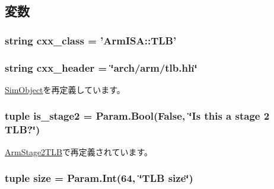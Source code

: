 \subsection{変数}
\hypertarget{classArmTLB_1_1ArmTLB_a58cd55cd4023648e138237cfc0822ae3}{
\subsubsection[{cxx\_\-class}]{\setlength{\rightskip}{0pt plus 5cm}string {\bf cxx\_\-class} = '{\bf ArmISA::TLB}'}}
\label{classArmTLB_1_1ArmTLB_a58cd55cd4023648e138237cfc0822ae3}
\hypertarget{classArmTLB_1_1ArmTLB_a17da7064bc5c518791f0c891eff05fda}{
\subsubsection[{cxx\_\-header}]{\setlength{\rightskip}{0pt plus 5cm}string {\bf cxx\_\-header} = \char`\"{}arch/arm/tlb.hh\char`\"{}}}
\label{classArmTLB_1_1ArmTLB_a17da7064bc5c518791f0c891eff05fda}


\hyperlink{classm5_1_1SimObject_1_1SimObject_a17da7064bc5c518791f0c891eff05fda}{SimObject}を再定義しています。\hypertarget{classArmTLB_1_1ArmTLB_a79c1ca5c107632a64c9583c96fbcc282}{
\subsubsection[{is\_\-stage2}]{\setlength{\rightskip}{0pt plus 5cm}tuple {\bf is\_\-stage2} = Param.Bool(False, \char`\"{}Is this a stage 2 TLB?\char`\"{})}}
\label{classArmTLB_1_1ArmTLB_a79c1ca5c107632a64c9583c96fbcc282}


\hyperlink{classArmTLB_1_1ArmStage2TLB_ae8e57fdf256a1e5df80b0c5ab8a52336}{ArmStage2TLB}で再定義されています。\hypertarget{classArmTLB_1_1ArmTLB_a377e5da8df1f89c5468c8b8cd07eac89}{
\subsubsection[{size}]{\setlength{\rightskip}{0pt plus 5cm}tuple {\bf size} = Param.Int(64, \char`\"{}TLB {\bf size}\char`\"{})}}
\label{classArmTLB_1_1ArmTLB_a377e5da8df1f89c5468c8b8cd07eac89}


